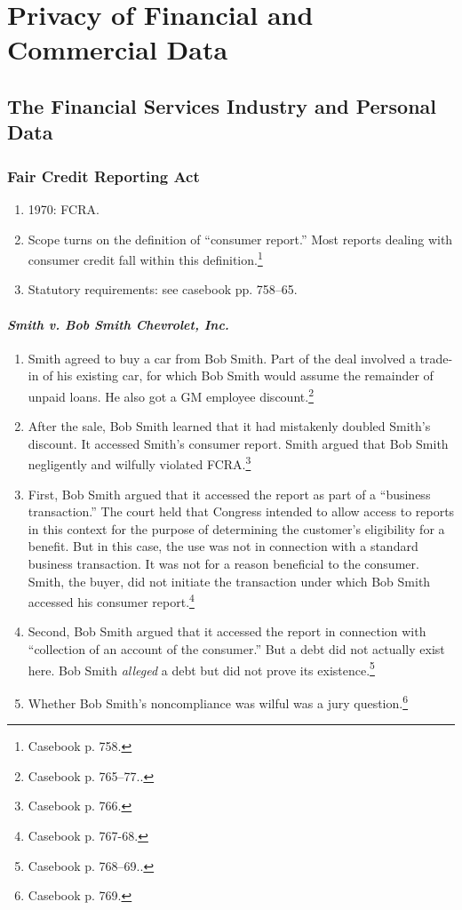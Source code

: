 \section{Privacy of Financial and Commercial Data}

\subsection{The Financial Services Industry and Personal Data}

\subsubsection{Fair Credit Reporting Act}

\begin{enumerate}
    \item 1970: FCRA.
    \item Scope turns on the definition of ``consumer report.'' Most reports 
    dealing with consumer credit fall within this definition.\footnote{Casebook 
    p. 758.}
    \item Statutory requirements: see casebook pp. 758--65.
\end{enumerate}

\paragraph{\emph{Smith v. Bob Smith Chevrolet, Inc.}}

\begin{enumerate}
    \item Smith agreed to buy a car from Bob Smith. Part of the deal involved a 
    trade-in of his existing car, for which Bob Smith would assume the remainder 
    of unpaid loans. He also got a GM employee discount.\footnote{Casebook p. 
    765--77..}
    \item After the sale, Bob Smith learned that it had mistakenly doubled 
    Smith's discount. It accessed Smith's consumer report. Smith argued that Bob 
    Smith negligently and wilfully violated FCRA.\footnote{Casebook p. 766.}
    \item First, Bob Smith argued that it accessed the report as part of a 
    ``business transaction.'' The court held that Congress intended to allow 
    access to reports in this context for the purpose of determining the 
    customer's eligibility for a benefit. But in this case, the use was not in 
    connection with a standard business transaction. It was not for a reason 
    beneficial to the consumer. Smith, the buyer, did not initiate the 
    transaction under which Bob Smith accessed his consumer 
    report.\footnote{Casebook p. 767-68.}
    \item Second, Bob Smith argued that it accessed the report in connection 
    with ``collection of an account of the consumer.'' But a debt did not 
    actually exist here. Bob Smith \emph{alleged} a debt but did not prove its 
    existence.\footnote{Casebook p. 768--69..}
    \item Whether Bob Smith's noncompliance was wilful was a jury 
    question.\footnote{Casebook p. 769.}
\end{enumerate}


